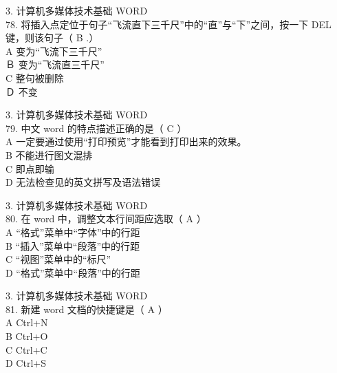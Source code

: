 \documentclass[aspectratio=169]{beamer}
\begin{document}
\begin{frame}[t]{3. 计算机多媒体技术基础} \vspace{20pt}
    WORD\\
78. 将插入点定位于句子“飞流直下三千尺”中的“直”与“下”之间，按一下 DEL 键，则该句子（ B .）\\
A 变为“飞流下三千尺”\\ Ｂ 变为“飞流直三千尺”\\
C 整句被删除\\ Ｄ 不变\\
\end{frame}

\begin{frame}[t]{3. 计算机多媒体技术基础} \vspace{20pt}
    WORD\\
79. 中文 word 的特点描述正确的是（ C ）\\
A 一定要通过使用“打印预览”才能看到打印出来的效果。\\
B 不能进行图文混排\\
C 即点即输\\
D 无法检查见的英文拼写及语法错误\\
\end{frame}


\begin{frame}[t]{3. 计算机多媒体技术基础} \vspace{20pt}
    WORD\\
80. 在 word 中，调整文本行间距应选取（ A ）\\
A “格式”菜单中“字体”中的行距\\ B “插入”菜单中“段落”中的行距\\
C “视图”菜单中的“标尺” \\D “格式”菜单中“段落”中的行距\\
\end{frame}




\begin{frame}[t]{3. 计算机多媒体技术基础} \vspace{20pt}
    WORD\\
81. 新建 word 文档的快捷键是（ A ）\\
A Ctrl+N\\ B Ctrl+O\\ C Ctrl+C\\ D Ctrl+S\\
\end{frame}
\end{document}
